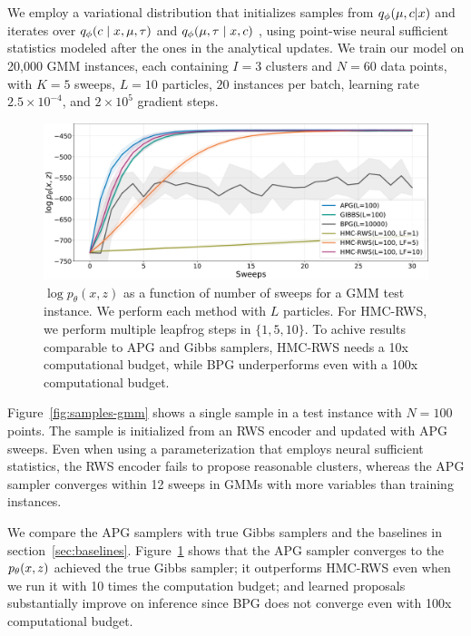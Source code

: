 \documentclass{article}
\theoremstyle{definition}
\begin{document}
We employ a variational distribution that initializes samples from $q_\phi(\mu, c | x)$ and iterates over $q_\phi(c \mid x, \mu, \tau)$ and $q_\phi(\mu, \tau \mid x, c)$ , using point-wise neural sufficient statistics modeled after the ones in the analytical updates.
We train our model on 20,000 GMM instances, each containing $I = 3$ clusters and $N = 60$ data points, with $K=5$ sweeps, $L=10$ particles, $20$ instances per batch, learning rate $2.5\times10^{-4}$, and $2\times10^5$ gradient steps.
\begin{figure}[t!]
\centering
\includegraphics[width=\columnwidth]{figures/convergence_gmm_v2.pdf}
  \caption{$\log p_\theta(x, z)$ as a function of number of sweeps for a GMM test instance. We perform each method with $L$ particles. For HMC-RWS, we perform multiple leapfrog steps  in $\{1,5,10\}$. To achive results comparable to APG and Gibbs samplers, HMC-RWS needs a 10x computational budget, while BPG underperforms even with a 100x computational budget.}
  \label{fig:convergence-gmm}
\end{figure}

Figure~\ref{fig:samples-gmm} shows a single sample in a test instance with $N=100$ points. The sample is initialized from an RWS encoder and updated with APG sweeps. Even when using a parameterization that employs neural sufficient statistics, the RWS encoder fails to propose reasonable clusters, whereas the APG sampler converges within 12 sweeps in GMMs with more variables than training instances.

We compare the APG samplers with true Gibbs samplers and the baselines in section~\ref{sec:baselines}. Figure~\ref{fig:convergence-gmm} shows that the APG sampler converges to the $p_\theta(x, z)$ achieved the true Gibbs sampler; it outperforms HMC-RWS even when we run it with 10 times the computation budget; and learned proposals substantially improve on inference since BPG does not converge even with 100x computational budget.
\end{document}
